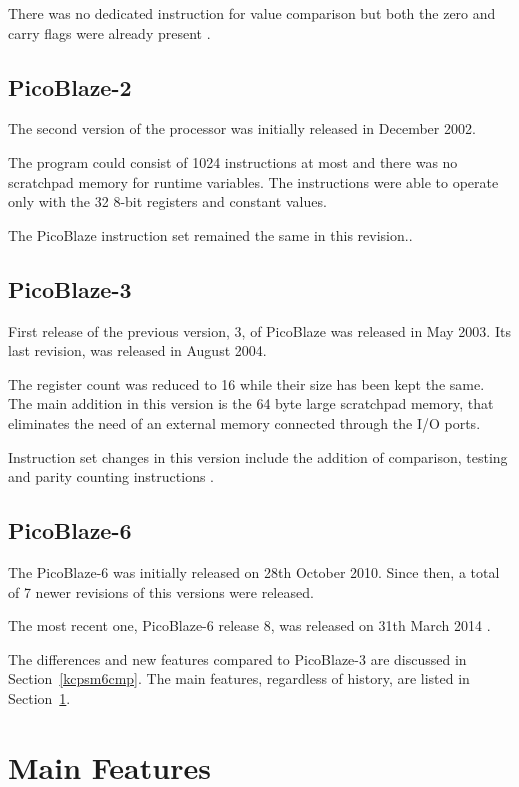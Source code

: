         There was no dedicated instruction for value comparison but both the zero and carry flags were already present \cite{PicoBlaze}.

        \subsection{PicoBlaze-2}

        The second version of the processor was initially released in December 2002.

        The program could consist of 1024 instructions at most and there was no scratchpad memory for runtime variables. The instructions were able to operate only with the 32 8-bit registers and constant values.

        The PicoBlaze instruction set remained the same in this revision.\cite{PicoBlaze2}.

        \subsection{PicoBlaze-3}

        First release of the previous version, 3, of PicoBlaze was released in May 2003. Its last revision, was released in August 2004.

        The register count was reduced to 16 while their size has been kept the same. The main addition in this version is the 64 byte large scratchpad memory, that eliminates the need of an external memory connected through the I/O ports.

        Instruction set changes in this version include the addition of comparison, testing and parity counting instructions \cite{PicoBlaze3}.

        \subsection{PicoBlaze-6}

        The PicoBlaze-6 was initially released on 28th October 2010. Since then, a total of 7 newer revisions of this versions were released.

        The most recent one, PicoBlaze-6 release 8, was released on 31th March 2014 \cite{PicoBlaze6}.

        The differences and new features compared to PicoBlaze-3 are discussed in Section~\ref{kcpsm6cmp}. The main features, regardless of history, are listed in Section~\ref{mainfeatures}.

    \section{Main Features}\label{mainfeatures}

